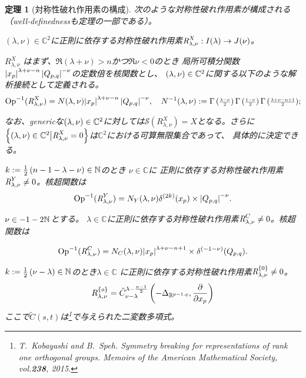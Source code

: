 \documentclass[12pt]{msjproc} %
\newcommand{\tmtextit}[1]{{\itshape{#1}}}
\newtheorem{theorem}{定理}
\theoremstyle{definition}
\newcommand{\Op}{\mbox{\normalfont Op}}
\newcommand{\OpR}{\mbox{\it R}}
\theoremstyle{remark}
\begin{document}
\begin{theorem}[対称性破れ作用素の構成]
	次のような対称性破れ作用素が構成される（well-definednessも定理の一部である）。\vspace{-0.3cm}
\begin{description}
		\vspace{-0.2cm}
		\item[regular SBO:]$(\lambda,\nu)\in \mathbb{C}^2$に正則に依存する対称性破れ作用素$\OpR^{X}_{\lambda,\nu}:I(\lambda)\to J(\nu)$。

				$R_{\lambda,\nu}^X$ はまず、$\Re(\lambda+\nu)>n$かつ$\Re\nu<0$のとき
				局所可積分関数$\left|x_p\right|^{\lambda+\nu-n}\left|Q_{p,q}\right|^{-\nu}$の定数倍を核関数とし、
				$(\lambda,\nu)\in\mathbb{C}^2$に関する以下のような解析接続として定義される。
				\[\Op^{-1}(\OpR^{X}_{\lambda,\nu})={N(\lambda,\nu)}{\myabs{x_p}^{\lambda+\nu-n}\myabs{Q_{p,q}}^{-\nu}},\quad N^{-1}(\lambda,\nu):=
					{\Gamma\left( \scalebox{0.8}{$\frac{\lambda-\nu}{2}$} \right)
					\Gamma\left( \scalebox{0.8}{$\frac{1-\nu}{2}$} \right)
				\Gamma\left( \scalebox{0.8}{$\frac{\lambda+\nu-n+1}{2}$} \right)};\]

				なお、genericな$(\lambda,\nu)\in\mathbb{C}^2$に対しては$\mathcal{S}(R_{\lambda,\nu}^X)=X$となる。さらに
				$\mysetn{(\lambda,\nu)\in\mathbb{C}^2}{\OpR^{X}_{\lambda,\nu}=0}$は$\mathbb{C}^2$における可算無限集合であって、
				具体的に決定できる。
				\newcommand{\sniptA}{$k:=\frac{1}{2}\left( n-1-\lambda-\nu \right)\in\N$のとき}
				\newcommand{\sniptB}{核超関数は}
				\newcommand{\sniptE}{\sniptB}
				\newcommand{\sniptC}{ここで$N_Y(\lambda,\nu)$は$\Gamma$関数で表示される}
				\newcommand{\sniptD}{genericな$\lambda$に対して$\mathcal{S}\left( R_{\lambda,\nu}^Y \right)=Y$}
				\newcommand{\sniptG}{$k:=\frac{1}{2}\left( \nu-\lambda \right)\in\N$のとき}
				\newcommand{\sniptH}{R_{\lambda,\nu}^{ \left\{ o \right\}}=\tilde{C}_{\nu-\lambda}^{\lambda-\frac{n-1}{2}}\mybra{-\Delta_{\R^{p-1,q}},\frac{\partial}{\partial x_p}}}
			\item[$Y$に付随する特異積分:]
				\sniptA
				$\nu\in\mathbb{C}$に
				正則に依存する対称性破れ作用素$\OpR^{Y}_{\lambda,\nu}\neq0$。\sniptB
						\[\Op^{-1}(\OpR^{Y}_{\lambda,\nu})={N_Y(\lambda,\nu)}{\delta^{(2k)}(x_p)\times\myabs{Q_{p,q}}
						^{-\nu}}.\]
			\item[$C$に付随する特異積分:]
				$\nu\in-1-2\mathbb{N}$とする。
				$\lambda\in \mathbb{C}$に正則に依存する対称性破れ作用素$\OpR^{C}_{\lambda,\nu}\neq0$。\sniptE
				 
					 \[\Op^{-1}(\OpR^{C}_{\lambda,\nu})={N_C
					 (\lambda,\nu)}{\myabs{x_p}^{\lambda+\nu-n+1}\times\delta^{(-1-\nu)}(Q_{p,q}) }.\]
			\item[微分対称性破れ作用素:] 
				\sniptG$\lambda\in\mathbb{C}$
				に正則に依存する対称性破れ作用素$\OpR^{ \left\{ 0 \right\} }_{\lambda,\nu}\neq0$。
				\[\sniptH\]
				ここで$\tilde{C}(s,t)$は{\normalfont [KS15,(16.3)]}\footnote{\label{note1}T.~Kobayashi and B.~Speh.
  {\newblock}Symmetry breaking for representations of rank one orthogonal
  groups. {\newblock}\tmtextit{Memoirs of the American Mathematical Society},
  vol.{\bf 238}, 2015.
}で与えられた二変数多項式。
	\end{description}

\end{theorem}
\end{document}
